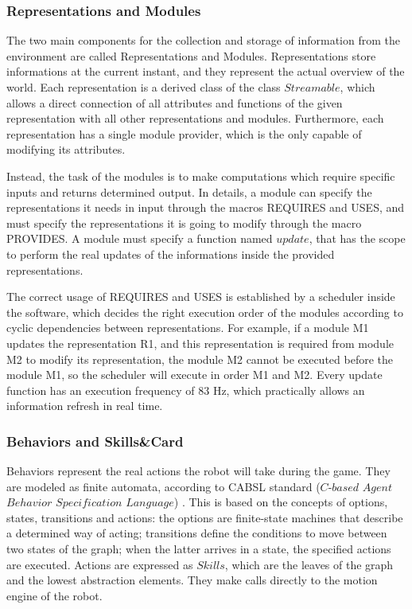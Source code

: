 \documentclass[a4paper, onecolumn, 12pt]{article}
\begin{document}
\subsubsection{Representations and Modules}
The two main components for the collection and storage of information from the environment
are called Representations and Modules.
Representations store informations at the current instant, and they represent the actual overview
of the world. Each representation is a derived class of the class $Streamable$, which allows a 
direct connection of all attributes and functions of the given representation with all other
representations and modules. Furthermore, each representation has a single module provider, which
is the only capable of modifying its attributes.

Instead, the task of the modules is to make computations which require specific inputs and returns
determined output. In details, a module can specify the representations it needs in input through
the macros REQUIRES and USES, and must specify the representations it is going to modify through
the macro PROVIDES. A module must specify a function named $update$, that has the scope to 
perform the real updates of the informations inside the provided representations.

The correct usage of REQUIRES and USES is established by a scheduler inside the software, which decides 
the right execution order of the modules according to cyclic dependencies between representations.
For example, if a module M1 updates the representation R1, and this representation is required from 
module M2 to modify its representation, the module M2 cannot be executed before the module M1, so the
scheduler will execute in order M1 and M2. 
Every update function has an execution frequency of 83 Hz, which practically allows an information 
refresh in real time.

\subsubsection{Behaviors and Skills\&Card}
Behaviors represent the real actions the robot will take during the game. They are modeled as finite 
automata, according to CABSL standard ($C$-$based$ $Agent$ $Behavior$ $Specification$ $Language$) \cite{}.
This is based on the concepts of options, states, transitions and actions: the options are finite-state machines that
describe a determined way of acting; transitions define the conditions to move between two states of the graph; 
when the latter arrives in a state, the specified actions are executed.
Actions are expressed as $Skills$, which are the leaves of the graph and the lowest abstraction elements.
They make calls directly to the motion engine of the robot.
\end{document}
